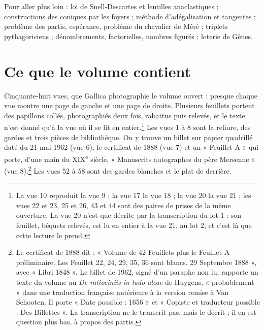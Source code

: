 \documentclass[11pt,a4paper]{article}
\begin{document}
\begin{resume}
Pour aller plus loin : loi de Snell-Descartes et lentilles anaclastiques ;
constructions des coniques par les foyers ; méthode d'adégalisation et
tangentes ; problème des partis, espérance, problème du chevalier de Méré ;
triplets pythagoriciens ; dénombrements, factorielles, nombres figurés ; loterie
de Gênes.

\end{resume}

\section*{Ce que le volume contient}

Cinquante-huit vues, que Gallica photographie le volume ouvert : presque chaque
vue montre une page de gauche et une page de droite. Plusieurs feuillets portent
des papillons collés, photographiés deux fois, rabattus puis relevés, et le
texte n'est donné qu'à la vue où il se lit en entier.\footnote{La vue 10
reproduit la vue 9 ; la vue 17 la vue 18 ; la vue 20 la vue 21 ; les vues 22 et
23, 25 et 26, 43 et 44 sont des paires de prises de la même ouverture. La vue 20
n'est que décrite par la transcription du lot 1 : son feuillet, béquets
relevés, est lu en entier à la vue 21, au lot 2, et c'est là que cette lecture
le prend.} Les vues 1 à 8 sont la reliure, des gardes et trois pièces de
bibliothèque. On y trouve un billet sur papier quadrillé daté du 21 mai 1962
(vue 6), le certificat de 1888 (vue 7) et un « Feuillet A » qui porte, d'une
main du XIX\textsuperscript{e} siècle, « Manuscrits autographes du père
Mersenne » (vue 8).\footnote{Le certificat de 1888 dit : « Volume de 42
Feuillets plus le Feuillet A préliminaire. Les Feuillet 22, 24, 29, 35, 36 sont
blancs. 29 Septembre 1888 », avec « Libri 1848 ». Le billet de 1962, signé d'un
paraphe non lu, rapporte un texte du volume au \emph{De ratiociniis in ludo
aleae} de Huygens, « probablement » dans une traduction française antérieure à
la version remise à Van Schooten. Il porte « Date possible : 1656 » et
« Copiste et traducteur possible : Des Billettes ». La transcription ne le
transcrit pas, mais le décrit ; il en est question plus bas, à propos des
partis.} Les vues 52 à 58 sont des gardes blanches et le plat de derrière.
\end{document}
